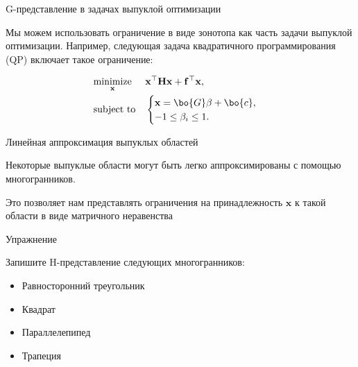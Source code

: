 \documentclass{beamer}
\begin{document}
\begin{frame}{G-представление в задачах выпуклой оптимизации}
	\begin{flushleft}
		
		Мы можем использовать ограничение в виде зонотопа как часть задачи выпуклой оптимизации. Например, следующая задача квадратичного программирования (QP) включает такое ограничение:
		
		\begin{equation}
			\begin{aligned}
				& \underset{\mathbf{x}}{\text{minimize}}
				& & \mathbf{x}^\top \mathbf{H} \mathbf{x} + \mathbf{f}^\top\mathbf{x}, \\
				& \text{subject to}
				& & \begin{cases}
					\mathbf{x} = \bo{G}\beta+\bo{c}, \\
					-1 \leq \beta_i \leq 1.
				\end{cases}
			\end{aligned}
		\end{equation}
		
	\end{flushleft}
\end{frame}




\begin{frame}{\small{Линейная аппроксимация выпуклых областей}}
	\begin{flushleft}
		Некоторые выпуклые области могут быть легко аппроксимированы с помощью многогранников.
		
		
		Это позволяет нам представлять ограничения на принадлежность $\mathbf{x}$ к такой области в виде матричного неравенства
		
	\end{flushleft}
\end{frame}



\begin{frame}{Упражнение}
	\begin{flushleft}
		
		Запишите H-представление следующих многогранников:
		
		\begin{itemize}
			\item Равносторонний треугольник
			\item Квадрат
			\item Параллелепипед
			\item Трапеция
		\end{itemize}
		
	\end{flushleft}
\end{frame}
\end{document}
